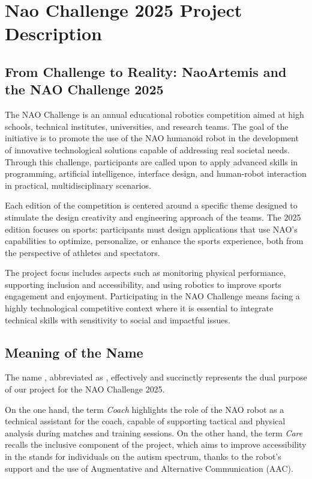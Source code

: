 \documentclass{optica-article}
\begin{document}
\section{Nao Challenge 2025 Project Description}

\subsection{From Challenge to Reality: NaoArtemis and the NAO Challenge 2025}
The NAO Challenge is an annual educational robotics competition aimed at high schools, technical institutes, universities, and research teams. The goal of the initiative is to promote the use of the NAO humanoid robot in the development of innovative technological solutions capable of addressing real societal needs. Through this challenge, participants are called upon to apply advanced skills in programming, artificial intelligence, interface design, and human-robot interaction in practical, multidisciplinary scenarios.

Each edition of the competition is centered around a specific theme designed to stimulate the design creativity and engineering approach of the teams. The 2025 edition focuses on sports: participants must design applications that use NAO's capabilities to optimize, personalize, or enhance the sports experience, both from the perspective of athletes and spectators.

The project focus includes aspects such as monitoring physical performance, supporting inclusion and accessibility, and using robotics to improve sports engagement and enjoyment. Participating in the NAO Challenge means facing a highly technological competitive context where it is essential to integrate technical skills with sensitivity to social and impactful issues.

\subsection{Meaning of the Name }

The name , abbreviated as , effectively and succinctly represents the dual purpose of our project for the NAO Challenge 2025.

On the one hand, the term \textit{Coach} highlights the role of the NAO robot as a technical assistant for the coach, capable of supporting tactical and physical analysis during matches and training sessions. On the other hand, the term \textit{Care} recalls the inclusive component of the project, which aims to improve accessibility in the stands for individuals on the autism spectrum, thanks to the robot's support and the use of Augmentative and Alternative Communication (AAC).
\end{document}
